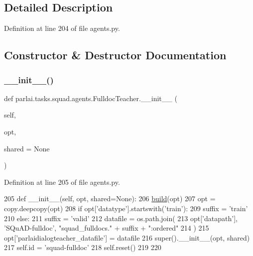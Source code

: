 \subsection{Detailed Description}


Definition at line 204 of file agents.\+py.



\subsection{Constructor \& Destructor Documentation}
\mbox{\label{classparlai_1_1tasks_1_1squad_1_1agents_1_1FulldocTeacher_aa686d3cf1506d8f17e373c0b5db6e1bd}} 
\subsubsection{\texorpdfstring{\+\_\+\+\_\+init\+\_\+\+\_\+()}{\_\_init\_\_()}}
{\footnotesize\ttfamily def parlai.\+tasks.\+squad.\+agents.\+Fulldoc\+Teacher.\+\_\+\+\_\+init\+\_\+\+\_\+ (\begin{DoxyParamCaption}\item[{}]{self,  }\item[{}]{opt,  }\item[{}]{shared = {\ttfamily None} }\end{DoxyParamCaption})}



Definition at line 205 of file agents.\+py.


\begin{DoxyCode}
205     \textcolor{keyword}{def }\_\_init\_\_(self, opt, shared=None):
206         \hyperlink{namespaceparlai_1_1mturk_1_1tasks_1_1talkthewalk_1_1download_a8c0fbb9b6dfe127cb8c1bd6e7c4e33fd}{build}(opt)
207         opt = copy.deepcopy(opt)
208         \textcolor{keywordflow}{if} opt[\textcolor{stringliteral}{'datatype'}].startswith(\textcolor{stringliteral}{'train'}):
209             suffix = \textcolor{stringliteral}{'train'}
210         \textcolor{keywordflow}{else}:
211             suffix = \textcolor{stringliteral}{'valid'}
212         datafile = os.path.join(
213             opt[\textcolor{stringliteral}{'datapath'}], \textcolor{stringliteral}{'SQuAD-fulldoc'}, \textcolor{stringliteral}{"squad\_fulldocs."} + suffix + \textcolor{stringliteral}{":ordered"}
214         )
215         opt[\textcolor{stringliteral}{'parlaidialogteacher\_datafile'}] = datafile
216         super().\_\_init\_\_(opt, shared)
217         self.id = \textcolor{stringliteral}{'squad-fulldoc'}
218         self.reset()
219 
220 
\end{DoxyCode}



